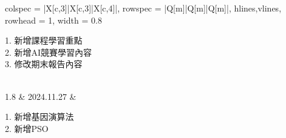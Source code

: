 \begin{longtblr}[
    caption = {版本異動紀錄},
    label = {table:version},
]{
    colspec = {|X[c,3]|X[c,3]|X[c,4]|},
    rowspec = {|Q[m]|Q[m]|Q[m]|},
    hlines,vlines,
    rowhead = 1,
    width = 0.8\linewidth
}
\begin{minipage}[c]{0.3\textwidth}
                        \vspace{10pt}
                        \centering %
                        \raggedright %
                        1. 新增課程學習重點\\ 
                        2. 新增AI競賽學習內容\\
                        3. 修改期末報告內容\\
                        \vspace{10pt}
                    \end{minipage} \\
1.8 & 2024.11.27 & \begin{minipage}[c]{0.3\textwidth}
                        \vspace{10pt}
                        \centering %
                        \raggedright %
                        1. 新增基因演算法\\ 
                        2. 新增PSO\\
                        \vspace{10pt}
                    \end{minipage} \\

\end{longtblr}






